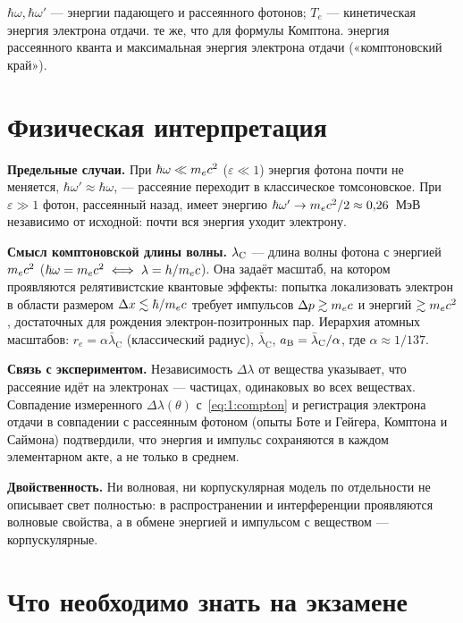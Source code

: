  {$\hbar\omega,\hbar\omega'$ — энергии падающего и рассеянного фотонов; $T_e$ — кинетическая энергия электрона отдачи.}
 {те же, что для формулы Комптона.}
 {энергия рассеянного кванта и максимальная энергия электрона отдачи («комптоновский край»).}

\section{Физическая интерпретация}

\textbf{Предельные случаи.} При $\hbar\omega\ll m_e c^2$ ($\varepsilon\ll1$) энергия фотона
почти не меняется, $\hbar\omega'\approx\hbar\omega$, — рассеяние переходит в классическое
томсоновское. При $\varepsilon\gg1$ фотон, рассеянный назад, имеет энергию $\hbar\omega'\to
m_e c^2/2\approx 0{,}26$~МэВ независимо от исходной: почти вся энергия уходит электрону.

\textbf{Смысл комптоновской длины волны.} $\lambda_{\mathrm C}$ — длина волны фотона с энергией $m_e c^2$
($\hbar\omega=m_e c^2\iff\lambda=h/m_e c$). Она задаёт масштаб, на котором проявляются
релятивистские квантовые эффекты: попытка локализовать электрон в области размером
$\Delta x\lesssim\hbar/m_e c$ требует импульсов $\Delta p\gtrsim m_e c$ и энергий $\gtrsim m_e c^2$,
достаточных для рождения электрон-позитронных пар. Иерархия атомных масштабов:
$r_e=\alpha\bar\lambda_{\mathrm C}$ (классический радиус), $\bar\lambda_{\mathrm C}$,
$a_{\mathrm B}=\bar\lambda_{\mathrm C}/\alpha$, где $\alpha\approx1/137$.

\textbf{Связь с экспериментом.} Независимость $\Delta\lambda$ от вещества указывает, что
рассеяние идёт на электронах — частицах, одинаковых во всех веществах. Совпадение измеренного
$\Delta\lambda(\theta)$ с~\eqref{eq:1:compton} и регистрация электрона отдачи в совпадении с
рассеянным фотоном (опыты Боте и Гейгера, Комптона и Саймона) подтвердили, что энергия и
импульс сохраняются в каждом элементарном акте, а не только в среднем.

\textbf{Двойственность.} Ни волновая, ни корпускулярная модель по отдельности не описывает свет
полностью: в распространении и интерференции проявляются волновые свойства, а в обмене
энергией и импульсом с веществом — корпускулярные.

\section{Что необходимо знать на экзамене}

